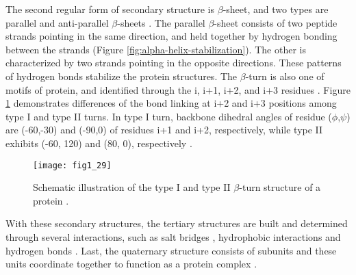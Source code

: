 \begin{refsection}
The second regular form of secondary structure is $\beta$-sheet, and two types
are parallel and anti-parallel $\beta$-sheets \cite{Astbury1932}. The parallel
$\beta$-sheet consists of two peptide strands pointing in the same
direction, and held together by hydrogen bonding between the strands (Figure
\ref{fig:alpha-helix-stabilization}). The other is characterized by two strands
pointing in the opposite directions. These patterns of hydrogen bonds stabilize
the protein structures. The $\beta$-turn is also one of motifs of protein, and
identified through the i, i+1, i+2, and i+3 residues \cite{Nemethy1972}. Figure
\ref{fig:beta-turn} demonstrates differences of the bond linking at i+2 and i+3
positions among type I and type II turns. In type I turn, backbone dihedral
angles of residue ($\phi$,$\psi$) are (-60,-30) and (-90,0) of residues i+1 and
i+2, respectively, while type II exhibits (-60, 120) and (80, 0), respectively
\cite{Nemethy1972}. 
\begin{figure}[htbp] 
    \centering \texttt{[image: fig1\_29]}
    \caption[Schematic illustration of the type I and type II $\beta$-turn
    structure of a protein.]{Schematic illustration of the type I and type II
        $\beta$-turn structure of a protein \cite{Nemethy1972}.} 
    \label{fig:beta-turn}
\end{figure}

With these secondary structures, the tertiary structures are built and
determined through several interactions, such as salt bridges
\cite{Privalov2009}, hydrophobic interactions \cite{Beadle2002a} and hydrogen
bonds \cite{Sheridan1982}.  Last, the quaternary structure consists of subunits
and these units coordinate together to function as a protein complex
\cite{Privalov2009}.


\end{refsection}
